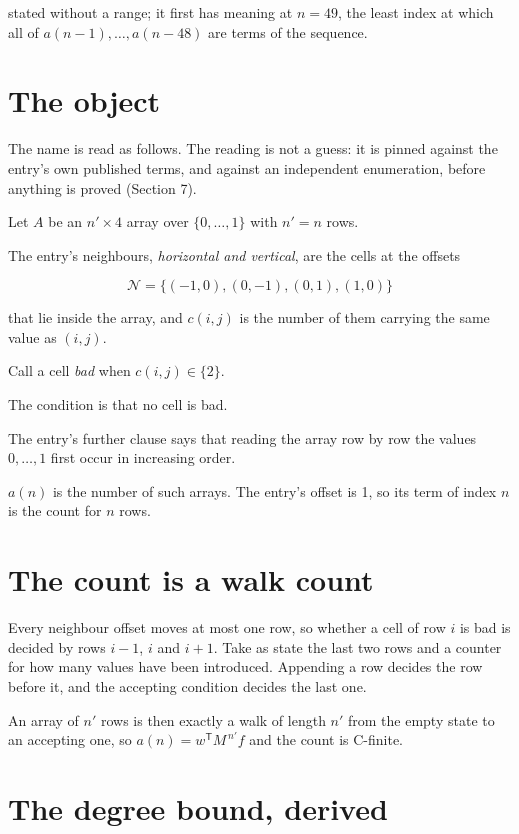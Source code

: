 \documentclass[11pt]{article}
\theoremstyle{definition}
\begin{document}
stated without a range; it first has meaning at $n = 49$, the least index at which all of $a(n-1),\dots,a(n-48)$ are terms of the sequence.

\section{The object}

The name is read as follows. The reading is not a guess: it is pinned against the entry's own published terms, and against an independent enumeration, before anything is proved (Section 7).

Let $A$ be an $n' \times 4$ array over $\{0,\dots,1\}$ with $n' = n$ rows.

The entry's neighbours, {\itshape horizontal and vertical}, are the cells at the offsets

\[\mathcal{N} = \{(-1,0), (0,-1), (0,1), (1,0)\}\]

that lie inside the array, and $c(i,j)$ is the number of them carrying the same value as $(i,j)$.

Call a cell {\itshape bad} when $c(i,j) \in \{2\}$.

The condition is that no cell is bad.

The entry's further clause says that reading the array row by row the values $0,\dots,1$ first occur in increasing order.

$a(n)$ is the number of such arrays. The entry's offset is 1, so its term of index $n$ is the count for $n$ rows.

\section{The count is a walk count}

Every neighbour offset moves at most one row, so whether a cell of row $i$ is bad is decided by rows $i-1$, $i$ and $i+1$. Take as state the last two rows and a counter for how many values have been introduced. Appending a row decides the row before it, and the accepting condition decides the last one.

An array of $n'$ rows is then exactly a walk of length $n'$ from the empty state to an accepting one, so $a(n) = w^{\mathsf T}M^{\,n'}f$ and the count is C-finite.

\section{The degree bound, derived}
\end{document}
